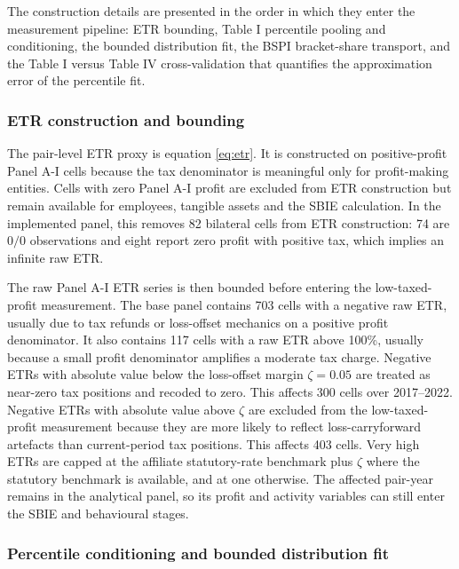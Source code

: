 \documentclass[11pt,a4paper]{article}
\begin{document}
The construction details are presented in the order in which they enter the measurement pipeline: ETR bounding, Table I percentile pooling and conditioning, the bounded distribution fit, the BSPI bracket-share transport, and the Table I versus Table IV cross-validation that quantifies the approximation error of the percentile fit.

\subsubsection{ETR construction and bounding}\label{sec:etr_bounding_appendix}

The pair-level ETR proxy is equation \eqref{eq:etr}. It is constructed on positive-profit Panel A-I cells because the tax denominator is meaningful only for profit-making entities. Cells with zero Panel A-I profit are excluded from ETR construction but remain available for employees, tangible assets and the SBIE calculation. In the implemented panel, this removes 82 bilateral cells from ETR construction: 74 are $0/0$ observations and eight report zero profit with positive tax, which implies an infinite raw ETR.

The raw Panel A-I ETR series is then bounded before entering the low-taxed-profit measurement. The base panel contains 703 cells with a negative raw ETR, usually due to tax refunds or loss-offset mechanics on a positive profit denominator. It also contains 117 cells with a raw ETR above 100\%, usually because a small profit denominator amplifies a moderate tax charge. Negative ETRs with absolute value below the loss-offset margin $\zeta=0.05$ are treated as near-zero tax positions and recoded to zero. This affects 300 cells over 2017--2022. Negative ETRs with absolute value above $\zeta$ are excluded from the low-taxed-profit measurement because they are more likely to reflect loss-carryforward artefacts than current-period tax positions. This affects 403 cells. Very high ETRs are capped at the affiliate statutory-rate benchmark plus $\zeta$ where the statutory benchmark is available, and at one otherwise. The affected pair-year remains in the analytical panel, so its profit and activity variables can still enter the SBIE and behavioural stages.

\subsubsection{Percentile conditioning and bounded distribution fit}\label{sec:percentile_fit_appendix}
\end{document}
